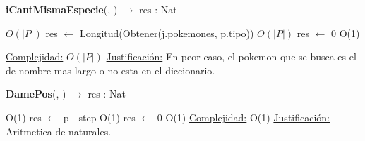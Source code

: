 \begin{algorithm}[H]{\textbf{iCantMismaEspecie}(, ) $\to$ res : Nat} 
	{}
	\begin{algorithmic}
		 \Comment $O(|P|)$
			\State res $\gets$ Longitud(Obtener(j.pokemones, p.tipo)) \Comment $O(|P|)$
		\Else
			\State res $\gets$ 0  \Comment O(1)
		\EndIf
	
		\medskip
		\Statex \underline{Complejidad:} $O(|P|)$
		\Statex \underline{Justificación:} En peor caso, el pokemon que se busca es el de nombre mas largo o no esta en el diccionario.
    \end{algorithmic}
\end{algorithm}

\begin{algorithm}[H]{\textbf{DamePos}(, ) $\to$ res : Nat} 
	{}
	\begin{algorithmic}
     \Comment O(1)
      \State res $\gets$ p - step \Comment O(1)
    \Else
      \State res $\gets$ 0 \Comment O(1)
    \EndIf
		\medskip
		\Statex \underline{Complejidad:} O(1)
		\Statex \underline{Justificación:} Aritmetica de naturales.
    \end{algorithmic}
\end{algorithm}
